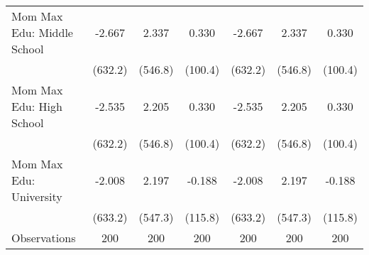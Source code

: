 {\begin{tabular}{l*{6}{c}}
\addlinespace
Mom Max Edu: Middle School&      -2.667         &       2.337         &       0.330         &      -2.667         &       2.337         &       0.330         \\
                    &     (632.2)         &     (546.8)         &     (100.4)         &     (632.2)         &     (546.8)         &     (100.4)         \\
\addlinespace
Mom Max Edu: High School&      -2.535         &       2.205         &       0.330         &      -2.535         &       2.205         &       0.330         \\
                    &     (632.2)         &     (546.8)         &     (100.4)         &     (632.2)         &     (546.8)         &     (100.4)         \\
\addlinespace
Mom Max Edu: University&      -2.008         &       2.197         &      -0.188         &      -2.008         &       2.197         &      -0.188         \\
                    &     (633.2)         &     (547.3)         &     (115.8)         &     (633.2)         &     (547.3)         &     (115.8)         \\
\midrule
Observations        &         200         &         200         &         200         &         200         &         200         &         200         \\
\bottomrule
\end{tabular}
}
